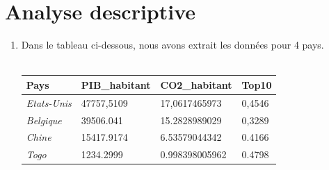 \documentclass[a4paper, 11pt]{article}
\begin{document}
\section{Analyse descriptive}
\begin{enumerate}[label=(\alph*)] 
    \item  Dans le tableau ci-dessous, nous avons extrait les données pour 4 pays.\\
    \\
    \begin{tabular}{|p{4.5cm}||p{3cm}|p{3cm}|p{3cm}|}
    \hline 
       \textbf{Pays}  &  \textbf{PIB\_habitant} & \textbf{CO2\_habitant} & \textbf{Top10} \\
       \hline \hline
        \textit{Etats-Unis} & 47757,5109 & 17,0617465973 & 0,4546\\
       \hline
       \textit{Belgique} & 39506.041 & 15.2828989029 & 0,3289 \\
         \hline
         \textit{Chine} & 15417.9174 & 6.53579044342 & 0.4166 \\
         \hline
         \textit{Togo} & 1234.2999 & 0.998398005962 & 0.4798 \\
         \hline
    \end{tabular}\\\\
    

\end{enumerate}
\end{document}
